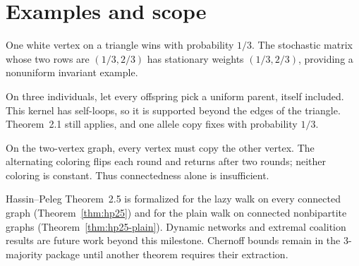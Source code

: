 \section{Examples and scope}
\begin{lemma}\label{lem:examples}
\leanok{}
One white vertex on a triangle wins with probability $1/3$.
The stochastic matrix whose two rows are $(1/3,2/3)$ has stationary
weights $(1/3,2/3)$, providing a nonuniform invariant example.
\end{lemma}
\begin{lemma}\label{lem:wf}
\leanok{}
On three individuals, let every offspring pick a uniform parent, itself included.
This kernel has self-loops, so it is supported beyond the edges of the triangle.
Theorem~2.1 still applies, and one allele copy fixes with probability $1/3$.
\end{lemma}
\begin{lemma}\label{lem:cycle}
\leanok{}
On the two-vertex graph, every vertex must copy the other vertex.
The alternating coloring flips each round and returns after two rounds;
neither coloring is constant. Thus connectedness alone is insufficient.
\end{lemma}
Hassin--Peleg Theorem~2.5 is formalized for the lazy walk on every connected graph
(Theorem~\ref{thm:hp25}) and for the plain walk on connected nonbipartite graphs
(Theorem~\ref{thm:hp25-plain}). Dynamic networks and extremal coalition results are future work
beyond this milestone. Chernoff bounds remain in the
3-majority package until another theorem requires their extraction.

